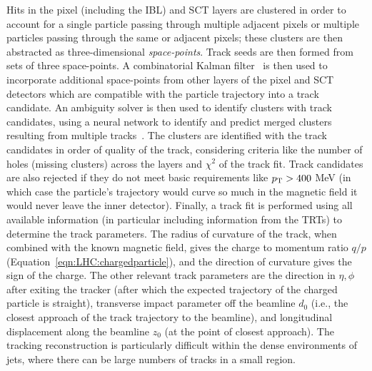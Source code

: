 Hits in the pixel (including the IBL) and SCT layers are clustered in order to account for a single particle passing through multiple adjacent pixels or multiple particles passing through the same or adjacent pixels; these clusters are then abstracted as three-dimensional \textit{space-points}.
Track seeds are then formed from sets of three space-points.
A combinatorial Kalman filter~\cite{Fruhwirth:1987fm} is then used to incorporate additional space-points from other layers of the pixel and SCT detectors which are compatible with the particle trajectory into a track candidate.
An ambiguity solver is then used to identify clusters with track candidates, using a neural network to identify and predict merged clusters resulting from multiple tracks~\cite{Aad:2014yva}.
The clusters are identified with the track candidates in order of quality of the track, considering criteria like the number of holes (missing clusters) across the layers and $\chi^2$ of the track fit.
Track candidates are also rejected if they do not meet basic requirements like $p_{\text{T}}>400$ MeV (in which case the particle's trajectory would curve so much in the magnetic field it would never leave the inner detector).
Finally, a track fit is performed using all available information (in particular including information from the TRTs) to determine the track parameters.
The radius of curvature of the track, when combined with the known magnetic field, gives the charge to momentum ratio $q/p$ (Equation~\ref{eqn:LHC:chargedparticle}), and the direction of curvature gives the sign of the charge.
The other relevant track parameters are the direction in $\eta,\phi$ after exiting the tracker (after which the expected trajectory of the charged particle is straight), transverse impact parameter off the beamline $d_0$ (i.e., the closest approach of the track trajectory to the beamline), and longitudinal displacement along the beamline $z_0$ (at the point of closest approach).
The tracking reconstruction is particularly difficult within the dense environments of jets, where there can be large numbers of tracks in a small region.

